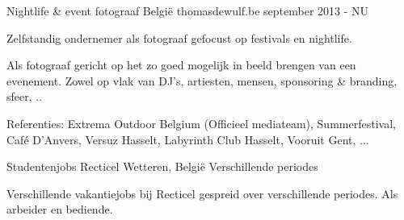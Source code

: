 \begin{cventries}
\cventry
{Nightlife \& event fotograaf} %
{België} %
{thomasdewulf.be} %
{september 2013 - NU} %
{ %
\begin{cvitems}
\item {Zelfstandig ondernemer als fotograaf gefocust op festivals en nightlife. }
\item {Als fotograaf gericht op het zo goed mogelijk in beeld brengen van een evenement. Zowel op vlak van DJ's, artiesten, mensen, sponsoring \& branding, sfeer, ..}
\item {Referenties: Extrema Outdoor Belgium (Officieel mediateam), Summerfestival, Café D'Anvers, Versuz Hasselt, Labyrinth Club Hasselt, Vooruit Gent, ...}
\end{cvitems}
}

\cventry
{Studentenjobs} %
{Recticel} %
{Wetteren, België} %
{Verschillende periodes} %
{ %
\begin{cvitems}
\item {Verschillende vakantiejobs bij Recticel gespreid over verschillende periodes. Als arbeider en bediende.}
\end{cvitems}
}



\end{cventries}